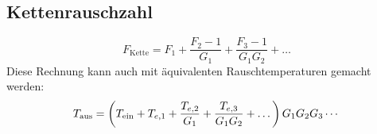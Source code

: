 \subsection{Kettenrauschzahl}
\begin{equation}
    F_\text{Kette} = F_1 + \frac{F_2-1}{G_1} + \frac{F_3-1}{G_1 G_2} + \dots
\end{equation}
Diese Rechnung kann auch mit äquivalenten Rauschtemperaturen gemacht werden:
\begin{equation}
    T_{\text{aus}} = \left(T_{\text{ein}} + T_{e,1} + \frac{T_{e,2}}{G_1} + \frac{T_{e,3}}{G_1 G_2} + \dots \right)G_1G_2G_3\cdots
\end{equation}
